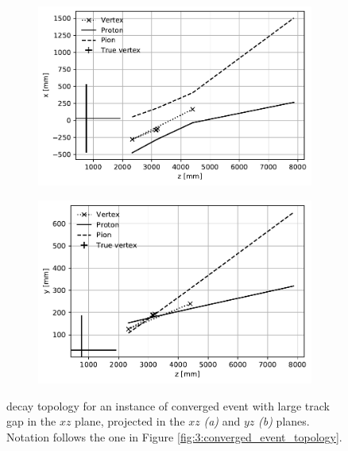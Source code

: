 \begin{figure}[t]
	\centering
	\begin{subfigure}{.45\textwidth}
		\includegraphics[width=\textwidth]{graphics/03-vertex_reconstruction/evt_6_zx.pdf}
		\caption{}
		\label{fig:3:converged_detached_zx}
	\end{subfigure}
	\begin{subfigure}{.45\textwidth}
		\includegraphics[width=\textwidth]{graphics/03-vertex_reconstruction/evt_6_zy.pdf}
		\caption{}
		\label{fig:3:converged_detached_zy}
	\end{subfigure}
	\caption{\lambdadecay decay topology for an instance of converged event with large track gap in the $xz$ plane, projected in the $xz$ \textit{(a)} and $yz$ \textit{(b)} planes.
	Notation follows the one in Figure \ref{fig:3:converged_event_topology}.}
	\label{fig:3:converged_detached_event_topology}
\end{figure}

